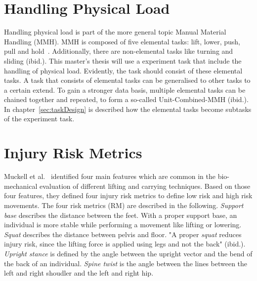 \section{Handling Physical Load}
\label{section:handlingphysicalload}
Handling physical load is part of the more general topic Manual Material Handling (MMH). MMH is composed of five elemental tasks: lift, lower, push, pull and hold~\cite{mmh}. Additionally, there are non-elemental tasks like turning and sliding (ibid.). This master's thesis will use a experiment task that include the handling of physical load. Evidently, the task should consist of these elemental tasks. A task that consists of elemental tasks can be generalised to other tasks to a certain extend. To gain a stronger data basis, multiple elemental tasks can be chained together and repeated, to form a so-called Unit-Combined-MMH (ibid.). In chapter~\ref{sec:taskDesign} is described how the elemental tasks become subtasks of the experiment task.

\section{Injury Risk Metrics}
\label{section:rm}
Muckell et al.~\cite{muckell} identified four main features which are common in the bio-mechanical evaluation of different lifting and carrying techniques. Based on those four features, they defined four injury risk metrics to define low risk and high risk movements. The four risk metrics (RM) are described in the following. \textit{Support base} describes the distance between the feet. With a proper support base, an individual is more stable while performing a movement like lifting or lowering. \textit{Squat} describes the distance between pelvis and floor. "A proper \textit{squat} reduces injury risk, since the lifting force is applied using legs and not the back" (ibid.). \textit{Upright stance} is defined by the angle between the upright vector and the bend of the back of an individual. \textit{Spine twist} is the angle between the lines between the left and right shoudler and the left and right hip.

